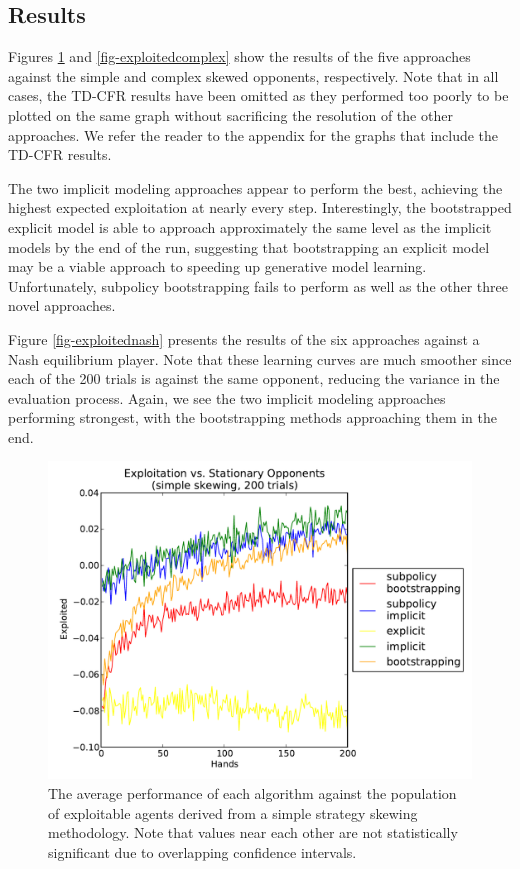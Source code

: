 \documentclass{aamas2013}
\begin{document}
    \subsection{Results}
    \label{sec-results}
    Figures \ref{fig-exploitedsimple} and \ref{fig-exploitedcomplex} show the results of the five approaches against the simple and complex skewed opponents, respectively. Note that in all cases, the TD-CFR results have been omitted as they performed too poorly to be plotted on the same graph without sacrificing the resolution of the other approaches. We refer the reader to the appendix for the graphs that include the TD-CFR results.

    The two implicit modeling approaches appear to perform the best, achieving the highest expected exploitation at nearly every step. Interestingly, the bootstrapped explicit model is able to approach approximately the same level as the implicit models by the end of the run, suggesting that bootstrapping an explicit model may be a viable approach to speeding up generative model learning. Unfortunately, subpolicy bootstrapping fails to perform as well as the other three novel approaches.

    Figure \ref{fig-exploitednash} presents the results of the six approaches against a Nash equilibrium player. Note that these learning curves are much smoother since each of the 200 trials is against the same opponent, reducing the variance in the evaluation process. Again, we see the two implicit modeling approaches performing strongest, with the bootstrapping methods approaching them in the end. 

    \begin{figure}[thb]
      \centering
        \includegraphics[scale=.45]{exploited_simple.pdf}
      \caption{The average performance of each algorithm against the population of exploitable agents derived from a simple strategy skewing methodology. Note that values near each other are not statistically significant due to overlapping confidence intervals.}
      \label{fig-exploitedsimple}
    \end{figure}
\end{document}
